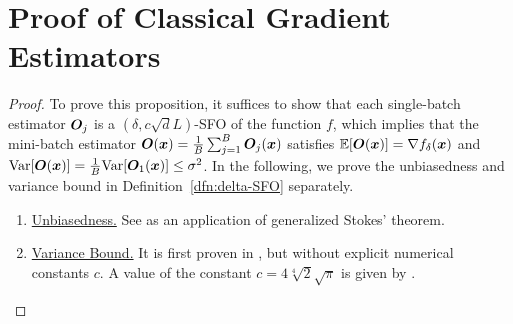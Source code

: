\section{Proof of Classical Gradient Estimators}
\propzoest*

\begin{proof}
	To prove this proposition, it suffices to show that each single-batch estimator ${\bm{O}}_j$ is a $(\delta, c \sqrt{d} L)$-SFO of the function $f$, which implies that the mini-batch estimator ${\bm{O}}({\bm{x}}) = \frac{1}{B} \sum_{j=1}^B {\bm{O}}_j({\bm{x}})$ satisfies $\mathbb{E} [{\bm{O}}({\bm{x}})] = \nabla f_{\delta}({\bm{x}}) $ and ${\rm Var}[{\bm{O}}({\bm{x}})] = \frac{1}{B} {\rm Var}[{\bm{O}}_1({\bm{x}})] \le \sigma^2$. In the following, we prove the unbiasedness and variance bound in Definition~\ref{dfn:delta-SFO} separately. 
	\begin{enumerate}
		\item \underline{Unbiasedness.} See \citep[Lemma 1]{flaxman2005online} as an application of generalized Stokes' theorem.
		\item \underline{Variance Bound.} It is first proven in \citep[Lemma 10]{shamir2017optimal}, but without explicit numerical constants $c$. 
		A value of the constant $c = 4 \sqrt[4]{2} \sqrt{\pi} $ is given by \citep[Lemma D.1]{lin2022gradient}.
	\end{enumerate}
	
	
	\underline{}{} 
\end{proof}

